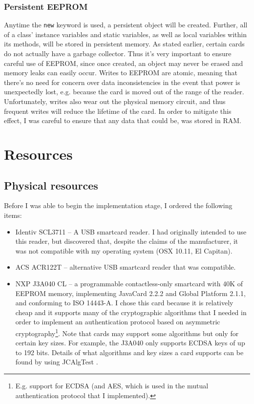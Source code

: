 \documentclass[12pt,a4paper,twoside,openright]{report}
\begin{document}
\subsubsection{Persistent EEPROM}

Anytime the \texttt{new} keyword is used, a persistent object will be created. Further, all of a class' instance variables and static variables, as well as local variables within its methods, will be stored in persistent memory. As stated earlier, certain cards do not actually have a garbage collector. Thus it's very important to ensure careful use of EEPROM, since once created, an object may never be erased and memory leaks can easily occur. Writes to EEPROM are atomic, meaning that there's no need for concern over data inconsistencies in the event that power is unexpectedly lost, e.g. because the card is moved out of the range of the reader. Unfortunately, writes also wear out the physical memory circuit, and thus frequent writes will reduce the lifetime of the card. In order to mitigate this effect, I was careful to ensure that any data that could be, was stored in RAM.

\section{Resources}

\subsection{Physical resources}

Before I was able to begin the implementation stage, I ordered the following items:

\begin{itemize}
\item Identiv SCL3711 -- A USB smartcard reader. I had originally intended to use this reader, but discovered that, despite the claims of the manufacturer, it was not compatible with my operating system (OSX 10.11, El Capitan).
\item ACS ACR122T -- alternative USB smartcard reader that was compatible.
\item NXP J3A040 CL -- a programmable contactless-only smartcard with 40K of EEPROM memory, implementing JavaCard 2.2.2 and Global Platform 2.1.1, and conforming to ISO 14443-A. I chose this card because it is relatively cheap and it supports many of the cryptographic algorithms that I needed in order to implement an authentication protocol based on asymmetric cryptography\footnote{E.g. support for ECDSA (and AES, which is used in the mutual authentication protocol that I implemented).}. Note that cards may support some algorithms but only for certain key sizes. For example, the J3A040 only supports ECDSA keys of up to 192 bits. Details of what algorithms and key sizes a card supports can be found by using JCAlgTest \cite{jcalgtest}.
\end{itemize}
\end{document}

